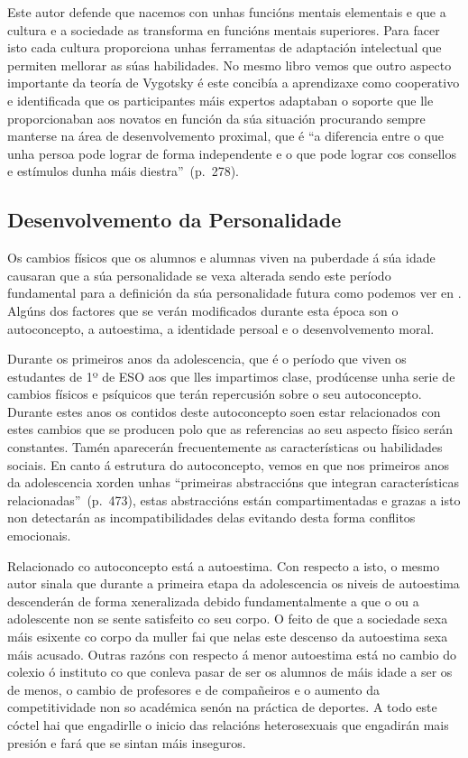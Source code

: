 Este autor defende que nacemos con unhas funcións mentais elementais e que a cultura e a sociedade as transforma en funcións mentais superiores. Para facer isto cada cultura proporciona unhas ferramentas de adaptación intelectual que permiten mellorar as súas habilidades. No mesmo libro vemos que outro aspecto importante da teoría de Vygotsky é este concibía a aprendizaxe como cooperativo e identificada que os participantes máis expertos adaptaban o soporte que lle proporcionaban aos novatos en función da súa situación procurando sempre manterse na área de desenvolvemento proximal, que é ``a diferencia entre o que unha persoa pode lograr de forma independente e o que pode lograr cos consellos e estímulos dunha máis diestra''~(p.~278).

\subsection{Desenvolvemento da Personalidade}
Os cambios físicos que os alumnos e alumnas viven na puberdade á súa idade causaran que a súa personalidade se vexa alterada sendo este período fundamental para a definición da súa personalidade futura como podemos ver en . Algúns dos factores que se verán modificados durante esta época son o autoconcepto, a autoestima, a identidade persoal e o desenvolvemento moral.

Durante os primeiros anos da adolescencia, que é o período que viven os estudantes de 1º de ESO aos que lles impartimos clase, prodúcense unha serie de cambios físicos e psíquicos que terán repercusión sobre o seu autoconcepto. Durante estes anos os contidos deste autoconcepto soen estar relacionados con estes cambios que se producen polo que as referencias ao seu aspecto físico serán constantes. Tamén aparecerán frecuentemente as características ou habilidades sociais. En canto á estrutura do autoconcepto, vemos en  que nos primeiros anos da adolescencia xorden unhas ``primeiras abstraccións que integran características relacionadas''~(p.~473), estas abstraccións están compartimentadas e grazas a isto non detectarán as incompatibilidades delas evitando desta forma conflitos emocionais.

Relacionado co autoconcepto está a autoestima. Con respecto a isto, o mesmo autor sinala que durante a primeira etapa da adolescencia os niveis de autoestima descenderán de forma xeneralizada debido fundamentalmente a que o ou a adolescente non se sente satisfeito co seu corpo. O feito de que a sociedade sexa máis esixente co corpo da muller fai que nelas este descenso da autoestima sexa máis acusado. Outras razóns con respecto á menor autoestima está no cambio do colexio ó instituto co que conleva pasar de ser os alumnos de máis idade a ser os de menos, o cambio de profesores e de compañeiros e o aumento da competitividade non so académica senón na práctica de deportes. A todo este cóctel hai que engadirlle o inicio das relacións heterosexuais que engadirán mais presión e fará que se sintan máis inseguros.

